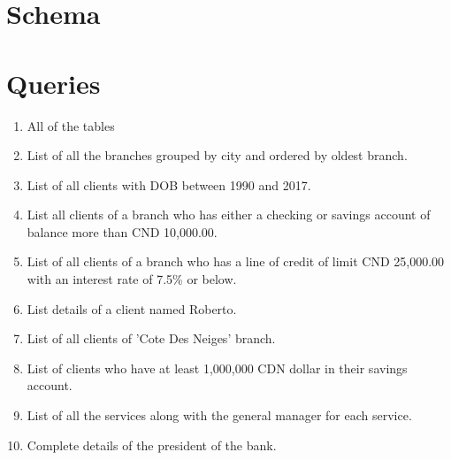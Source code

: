 \documentclass[letterpaper, 12pt]{article}
\begin{document}
\section{Schema}

\begin{figure}[ht]
  
\end{figure}

\begin{figure}[ht]
  
\end{figure}

\section{Queries}

\begin{enumerate}[label=(\alph*)]
  \item All of the tables
  \item List of all the branches grouped by city and ordered by oldest branch.
  \item List of all clients with DOB between 1990 and 2017.
  \item List all clients of a branch who has either a checking or savings account of balance more than CND 10,000.00.
  \item List of all clients of a branch who has a line of credit of limit CND 25,000.00 with an interest rate of 7.5\% or below.
  \item List details of a client named Roberto.
  \item List of all clients of 'Cote Des Neiges' branch.
  \item List of clients who have at least 1,000,000 CDN dollar in their savings account.
  \item List of all the services along with the general manager for each service.
  \item Complete details of the president of the bank.
\end{enumerate}
\end{document}
